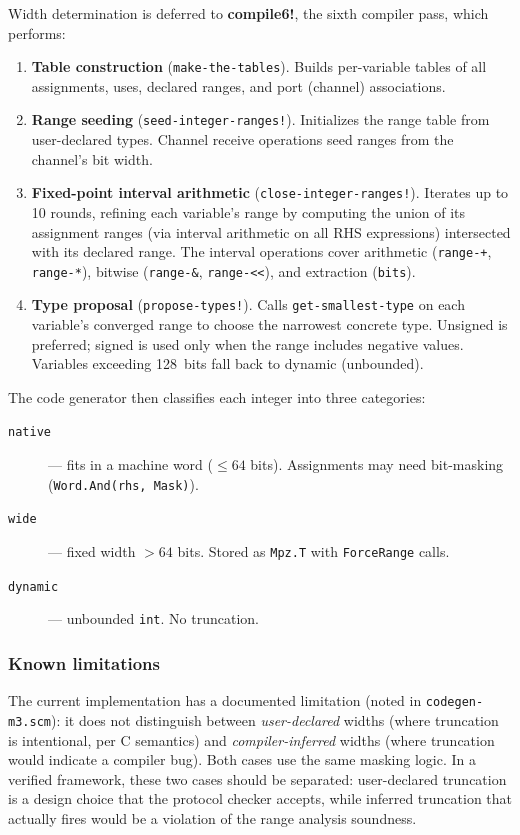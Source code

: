 \documentclass[11pt]{article}
\begin{document}
Width determination is deferred to \textbf{compile6!}, the sixth
compiler pass, which performs:
\begin{enumerate}
\item \textbf{Table construction} (\texttt{make-the-tables}).  Builds
  per-variable tables of all assignments, uses, declared ranges, and
  port (channel) associations.

\item \textbf{Range seeding} (\texttt{seed-integer-ranges!}).
  Initializes the range table from user-declared types.  Channel
  receive operations seed ranges from the channel's bit width.

\item \textbf{Fixed-point interval arithmetic}
  (\texttt{close-integer-ranges!}).  Iterates up to 10 rounds,
  refining each variable's range by computing the union of its
  assignment ranges (via interval arithmetic on all RHS expressions)
  intersected with its declared range.  The interval operations cover
  arithmetic (\texttt{range-+}, \texttt{range-*}), bitwise
  (\texttt{range-\&}, \texttt{range-<<}), and extraction
  (\texttt{bits}).

\item \textbf{Type proposal} (\texttt{propose-types!}).
  Calls \texttt{get-smallest-type} on each variable's converged range
  to choose the narrowest concrete type.  Unsigned is preferred;
  signed is used only when the range includes negative values.
  Variables exceeding 128~bits fall back to dynamic (unbounded).
\end{enumerate}

The code generator then classifies each integer into three categories:
\begin{description}
\item[\texttt{native}] --- fits in a machine word ($\leq 64$ bits).
  Assignments may need bit-masking (\texttt{Word.And(rhs, Mask)}).
\item[\texttt{wide}] --- fixed width $> 64$ bits.  Stored as
  \texttt{Mpz.T} with \texttt{ForceRange} calls.
\item[\texttt{dynamic}] --- unbounded \texttt{int}.  No truncation.
\end{description}

\subsubsection{Known limitations}

The current implementation has a documented limitation (noted in
\texttt{codegen-m3.scm}): it does not distinguish between
\emph{user-declared} widths (where truncation is intentional, per C
semantics) and \emph{compiler-inferred} widths (where truncation
would indicate a compiler bug).  Both cases use the same masking
logic.  In a verified framework, these two cases should be separated:
user-declared truncation is a design choice that the protocol checker
accepts, while inferred truncation that actually fires would be a
violation of the range analysis soundness.
\end{document}
